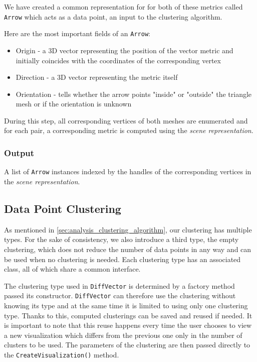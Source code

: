 We have created a common representation for for both of these metrics called \verb+Arrow+ which acts as a data point, an input to the clustering algorithm.

Here are the most important fields of an \verb+Arrow+:

\begin{itemize}
\item Origin - a 3D vector representing the position of the vector metric and initially coincides with the coordinates of the corresponding vertex
\item Direction - a 3D vector representing the metric itself
\item Orientation - tells whether the arrow points "inside" or "outside" the triangle mesh or if the orientation is unknown
\end{itemize}

During this step, all corresponding vertices of both meshes are enumerated and for each pair, a corresponding metric is computed using the {\it scene representation}.

\subsubsection{Output}

A list of \verb+Arrow+ instances indexed by the handles of the corresponding vertices in the {\it scene representation}.

\subsection{Data Point Clustering}
\label{sec:implementation_clustering}

As mentioned in \ref{sec:analysis_clustering_algorithm}, our clustering has multiple types. For the sake of consistency, we also introduce a third type, the empty clustering, which does not reduce the number of data points in any way and can be used when no clustering is needed. Each clustering type has an associated class, all of which share a common interface.

The clustering type used in \verb+DiffVector+ is determined by a factory method passed its constructor. \verb+DiffVector+ can therefore use the clustering without knowing its type and at the same time it is limited to using only one clustering type. Thanks to this, computed clusterings can be saved and reused if needed. It is important to note that this reuse happens every time the user chooses to view a new visualization which differs from the previous one only in the number of clusters to be used. The parameters of the clustering are then passed directly to the \verb+CreateVisualization()+ method.

